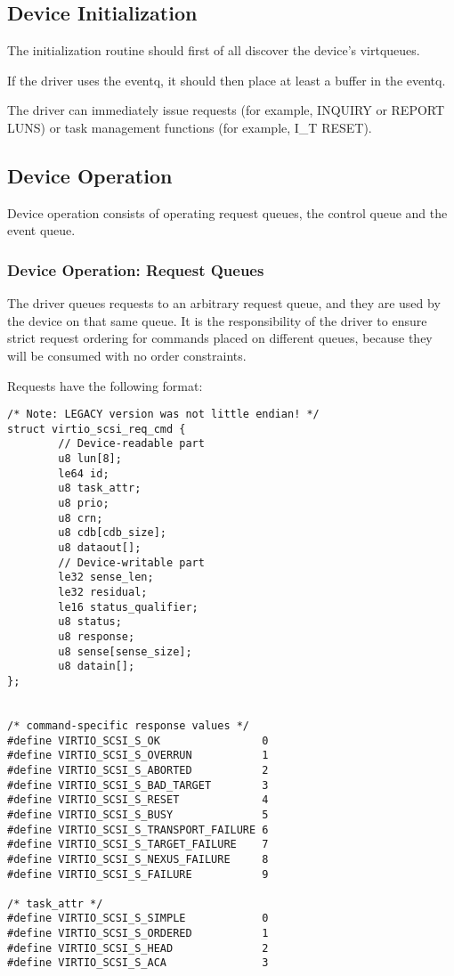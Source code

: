 \subsection{Device Initialization}\label{sec:Device Types / SCSI Host Device / Device Initialization}

The initialization routine should first of all discover the
device's virtqueues.

If the driver uses the eventq, it should then place at least a
buffer in the eventq.

The driver can immediately issue requests (for example, INQUIRY
or REPORT LUNS) or task management functions (for example, I_T
RESET).

\subsection{Device Operation}\label{sec:Device Types / SCSI Host Device / Device Operation}

Device operation consists of operating request queues, the control
queue and the event queue.

\subsubsection{Device Operation: Request Queues}\label{sec:Device Types / SCSI Host Device / Device Operation / Device Operation: Request Queues}

The driver queues requests to an arbitrary request queue, and
they are used by the device on that same queue. It is the
responsibility of the driver to ensure strict request ordering
for commands placed on different queues, because they will be
consumed with no order constraints.

Requests have the following format:

\begin{lstlisting}
/* Note: LEGACY version was not little endian! */
struct virtio_scsi_req_cmd {
        // Device-readable part
        u8 lun[8];
        le64 id;
        u8 task_attr;
        u8 prio;
        u8 crn;
        u8 cdb[cdb_size];
        u8 dataout[];
        // Device-writable part
        le32 sense_len;
        le32 residual;
        le16 status_qualifier;
        u8 status;
        u8 response;
        u8 sense[sense_size];
        u8 datain[];
};


/* command-specific response values */
#define VIRTIO_SCSI_S_OK                0
#define VIRTIO_SCSI_S_OVERRUN           1
#define VIRTIO_SCSI_S_ABORTED           2
#define VIRTIO_SCSI_S_BAD_TARGET        3
#define VIRTIO_SCSI_S_RESET             4
#define VIRTIO_SCSI_S_BUSY              5
#define VIRTIO_SCSI_S_TRANSPORT_FAILURE 6
#define VIRTIO_SCSI_S_TARGET_FAILURE    7
#define VIRTIO_SCSI_S_NEXUS_FAILURE     8
#define VIRTIO_SCSI_S_FAILURE           9

/* task_attr */
#define VIRTIO_SCSI_S_SIMPLE            0
#define VIRTIO_SCSI_S_ORDERED           1
#define VIRTIO_SCSI_S_HEAD              2
#define VIRTIO_SCSI_S_ACA               3
\end{lstlisting}

